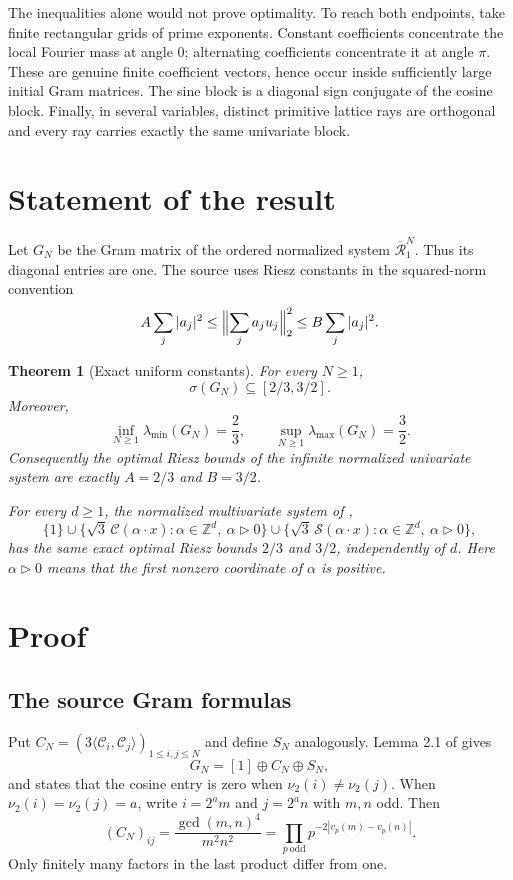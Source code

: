 \documentclass[11pt]{article}
\newtheorem{theorem}{Theorem}
\newcommand{\Z}{\mathbb Z}
\newcommand{\CalC}{\mathcal C}
\newcommand{\CalS}{\mathcal S}
\newcommand{\vtwo}{\nu_2}
\begin{document}
The inequalities alone would not prove optimality.  To reach both endpoints,
take finite rectangular grids of prime exponents.  Constant coefficients
concentrate the local Fourier mass at angle \(0\); alternating coefficients
concentrate it at angle \(\pi\).  These are genuine finite coefficient
vectors, hence occur inside sufficiently large initial Gram matrices.  The
sine block is a diagonal sign conjugate of the cosine block.  Finally, in
several variables, distinct primitive lattice rays are orthogonal and every
ray carries exactly the same univariate block.

\section{Statement of the result}

Let \(G_N\) be the Gram matrix of the ordered normalized system
\(\overline{\mathcal R}_1^N\).  Thus its diagonal entries are one.  The source
uses Riesz constants in the squared-norm convention
\[
 A\sum_j|a_j|^2\leq \Bigl\|\sum_j a_j u_j\Bigr\|_2^2
 \leq B\sum_j|a_j|^2.
\]

\begin{theorem}[Exact uniform constants]\label{thm:main}
For every \(N\geq1\),
\[
 \sigma(G_N)\subseteq[2/3,3/2].
\]
Moreover,
\[
 \inf_{N\geq1}\lambda_{\min}(G_N)=\frac23,
 \qquad
 \sup_{N\geq1}\lambda_{\max}(G_N)=\frac32.
\]
Consequently the optimal Riesz bounds of the infinite normalized univariate
system are exactly \(A=2/3\) and \(B=3/2\).

For every \(d\geq1\), the normalized multivariate system of \cite{SV},
\[
 \{1\}\cup
 \{\sqrt3\,\CalC(\alpha\cdot x):\alpha\in\Z^d,\ \alpha\mathbin{\triangleright}0\}
 \cup
 \{\sqrt3\,\CalS(\alpha\cdot x):\alpha\in\Z^d,\ \alpha\mathbin{\triangleright}0\},
\]
has the same exact optimal Riesz bounds \(2/3\) and \(3/2\), independently of
\(d\).  Here \(\alpha\mathbin{\triangleright}0\) means that the first nonzero
coordinate of \(\alpha\) is positive.
\end{theorem}

\section{Proof}

\subsection{The source Gram formulas}

Put \(C_N=(3\langle\CalC_i,\CalC_j\rangle)_{1\leq i,j\leq N}\) and define
\(S_N\) analogously.  Lemma 2.1 of \cite{SV} gives
\[
 G_N=[1]\oplus C_N\oplus S_N,
\]
and states that the cosine entry is zero when \(\vtwo(i)\neq\vtwo(j)\).
When \(\vtwo(i)=\vtwo(j)=a\), write \(i=2^am\) and \(j=2^an\) with \(m,n\)
odd.  Then
\begin{equation}\label{eq:odd-kernel}
 (C_N)_{ij}
 =\frac{\gcd(m,n)^4}{m^2n^2}
 =\prod_{p\ \mathrm{odd}}p^{-2|v_p(m)-v_p(n)|}.
\end{equation}
Only finitely many factors in the last product differ from one.
\end{document}
